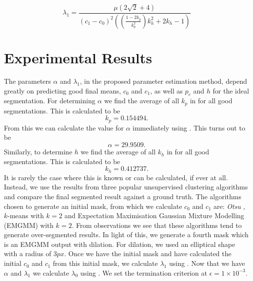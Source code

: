 \begin{equation}
	\lambda_1 = \frac{\mu \left( 2\sqrt{2}+4\right)}{(c_1-c_0)^2\left( \left( \frac{1-2k_p}{k_p^2} \right)k_h^2 +2k_h -1 \right)}
	\label{eq:lambda1fromkpandkh}
\end{equation}

\section{Experimental Results}
\label{sec:cvgc_experimentalresults}

The parameters $\alpha$ and $\lambda_1$, in the proposed parameter estimation method, depend greatly on predicting good final means, $c_0$ and $c_1$, as well as $p_e$ and $h$ for the ideal segmentation. For determining $\alpha$ we find the average of all $k_p$ in  for all good segmentations. This is calculated to be
\begin{equation*}
	k_p = 0.154494.
\end{equation*}
From this we can calculate the value for $\alpha$ immediately using . This turns out to be
\begin{equation}
\alpha = 29.9509.
\end{equation}
Similarly, to determine $h$ we find the average of all $k_h$ in  for all good segmentations. This is calculated to be
\begin{equation*}
	k_h = 0.412737.
\end{equation*}
It is rarely the case where this is known or can be calculated, if ever at all. Instead, we use the results from three popular unsupervised clustering algorithms and compare the final segmented result against a ground truth. The algorithms chosen to generate an initial mask, from which we calculate $c_0$ and $c_1$ are: \textit{Otsu} \citep{Otsu1979}, $k$-means \citep{Kanungo2002} with $k=2$ and Expectation Maximisation Gaussian Mixture Modelling (EMGMM) \citep{Figueiredo2002} with $k=2$. From observations we see that these algorithms tend to generate over-segmented results. In light of this, we generate a fourth mask which is an EMGMM output with dilation. For dilation, we used an elliptical shape with a radius of $3px$. Once we have the initial mask and have calculated the initial $c_0$ and $c_1$ from this initial mask, we calculate $\lambda_1$ using . Now that we have $\alpha$ and $\lambda_1$ we calculate $\lambda_0$ using . We set the termination criterion at $\epsilon=1 \times 10^{-3}$.

